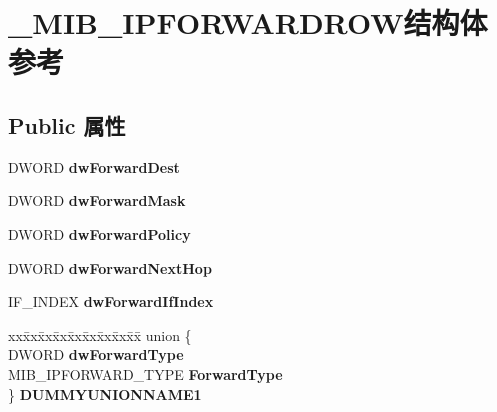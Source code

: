 \hypertarget{struct___m_i_b___i_p_f_o_r_w_a_r_d_r_o_w}{}\section{\+\_\+\+M\+I\+B\+\_\+\+I\+P\+F\+O\+R\+W\+A\+R\+D\+R\+O\+W结构体 参考}
\label{struct___m_i_b___i_p_f_o_r_w_a_r_d_r_o_w}
\subsection*{Public 属性}
\begin{DoxyCompactItemize}
\item 
\mbox{\label{struct___m_i_b___i_p_f_o_r_w_a_r_d_r_o_w_aba40ab700e2e7a664127b13fae4b6389}} 
D\+W\+O\+RD {\bfseries dw\+Forward\+Dest}
\item 
\mbox{\label{struct___m_i_b___i_p_f_o_r_w_a_r_d_r_o_w_acd188bec6175469777fc89b917d53652}} 
D\+W\+O\+RD {\bfseries dw\+Forward\+Mask}
\item 
\mbox{\label{struct___m_i_b___i_p_f_o_r_w_a_r_d_r_o_w_a4173c33261d855254100296a73d37759}} 
D\+W\+O\+RD {\bfseries dw\+Forward\+Policy}
\item 
\mbox{\label{struct___m_i_b___i_p_f_o_r_w_a_r_d_r_o_w_a26d35a6910d06165776b968703f32f1b}} 
D\+W\+O\+RD {\bfseries dw\+Forward\+Next\+Hop}
\item 
\mbox{\label{struct___m_i_b___i_p_f_o_r_w_a_r_d_r_o_w_ab20f6d97ca1f1ef39bca693a63833d7a}} 
I\+F\+\_\+\+I\+N\+D\+EX {\bfseries dw\+Forward\+If\+Index}
\item 
\mbox{\label{struct___m_i_b___i_p_f_o_r_w_a_r_d_r_o_w_a95c940938e73a61d514b96dbd2a827d9}} 
\begin{tabbing}
xx\=xx\=xx\=xx\=xx\=xx\=xx\=xx\=xx\=\kill
union \{\\
\>DWORD {\bfseries dwForwardType}\\
\>MIB\_IPFORWARD\_TYPE {\bfseries ForwardType}\\
\} {\bfseries DUMMYUNIONNAME1}\\


\end{tabbing}
\end{DoxyCompactItemize}
